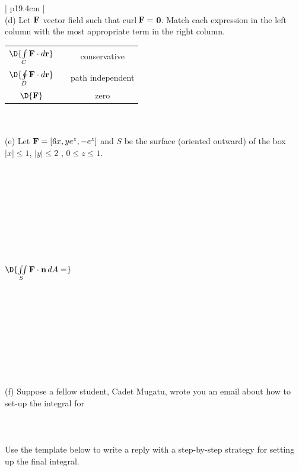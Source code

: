 \documentclass[12pt]{amsart}
\numberwithin{equation}{section}
\begin{document}
{\thispagestyle{empty}
\newpage
\thispagestyle{empty}

{\setlength{\extrarowheight}{-0.3cm}
\begin{tabular}{| p{19.4cm} |}
	\hline
	\\
	(d) Let $\text{\bf F}$ vector field such that curl\,$\text{\bf F} =$ {\bf 0}.
Match each expression in the left column with the most appropriate term in the right column.
	\begin{center}
	\begin{tabular}{cp{2cm}c}
		$\D{\int \limits_{C} \text{\bf F}\cdot d\text{\bf r}}$ & & conservative\\
		$\D{\oint \limits_{D} \text{\bf F}\cdot d\text{\bf r}}$ & & path independent\\
		$\D{\text{\bf F}}$ & & zero\\
	\end{tabular}
	\end{center}
	\\
	\hline
	\\
	(e) Let $\text{\bf F} = [6x,ye^z,-e^z]$ and $S$ be the surface (oriented outward) of the box $|x|\le 1$, $|y|\le 2$ , $0\le z \le 1$.
	\\\\\\\\\\\\\\\\\\\\
	$\D{\iint \limits_{S} \text{\bf F}\cdot \text{\bf n} \, dA =}$
	\\\\\\\\\\\\\\\\\\
	\hline
	\\
	(f) Suppose a fellow student, Cadet Mugatu, wrote you an email about how to set-up the integral for \\
	\\
	 \\
	\\
	Use the template below to write a reply with a step-by-step strategy for setting up the final integral. \\

\end{tabular}}}
\end{document}
